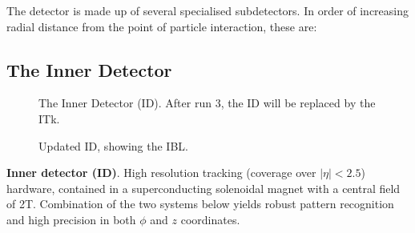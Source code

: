 The detector is made up of several specialised subdetectors. In order of increasing radial distance from the point of particle interaction, these are:





\subsection{The Inner Detector}

%
\begin{figure}[ht]
    \centering
    \caption{The Inner Detector (ID). After run 3, the ID will be replaced by the ITk.}
    \label{fig:ATLAS-id-run1
    }
\end{figure}
%

%
\begin{figure}[ht]
    \centering
    \caption{Updated ID, showing the IBL.}
    \label{fig:ATLAS-id-run2}
\end{figure}
%

\textbf{Inner detector (ID)}. High resolution tracking (coverage over $|\eta| < 2.5$) hardware, contained in a superconducting solenoidal magnet with a central field of 2T. Combination of the two systems below yields robust pattern recognition and high precision in both $\phi$ and $z$ coordinates.

